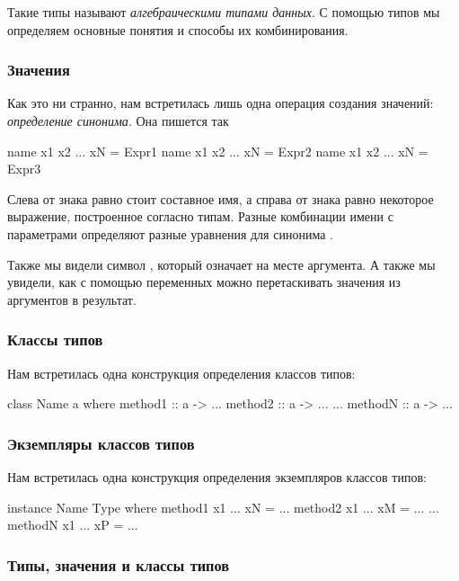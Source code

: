 Такие типы называют 
\emph{алгебраическими типами данных}.
С помощью типов мы определяем основные понятия и способы
их комбинирования.

\subsubsection{Значения}

Как это ни странно, нам встретилась лишь одна операция
создания значений: \emph{определение синонима}. Она пишется так

\begin{code}
name x1  x2 ... xN = Expr1
name x1  x2 ... xN = Expr2
name x1  x2 ... xN = Expr3
\end{code}

Слева от знака равно стоит составное имя, а справа от знака
равно некоторое выражение, построенное согласно типам.
Разные комбинации имени  с параметрами определяют
разные уравнения для синонима .

Также мы видели символ \In{_}, который означает 
на месте аргумента. А также мы  увидели, как с помощью переменных
можно перетаскивать значения из аргументов в результат.


\subsubsection{Классы типов}

Нам встретилась одна конструкция определения классов типов:

\begin{code}
class Name a where
    method1 :: a -> ...
    method2 :: a -> ...
    ...
    methodN :: a -> ...
\end{code}

\subsubsection{Экземпляры классов типов}

Нам встретилась одна конструкция определения экземпляров
классов типов:

\begin{code}
instance Name Type where
    method1 x1 ... xN = ...
    method2 x1 ... xM = ...
    ...
    methodN x1 ... xP = ...
\end{code}
\subsubsection{Типы, значения и классы типов}


